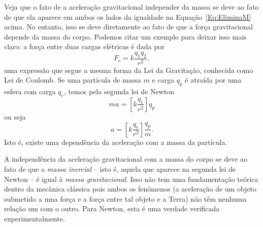 Veja que o fato de a aceleração gravitacional independer da massa se deve ao fato de que ela aparece em ambos os lados da igualdade na Equação~\eqref{Eq:EliminaM} acima. No entanto, isso se deve diretamente ao fato de que a força gravitacional depende da massa do corpo. Podemos citar um exemplo para deixar isso mais claro: a força entre duas cargas elétricas é dada por
\begin{equation}
  F_c = k \frac{q_1q_2}{r^2},
\end{equation}
%
uma expressão que segue a mesma forma da Lei da Gravitação, conhecida como Lei de Coulomb. Se uma partícula de massa $m$ e carga $q_p$ é atraída por uma esfera com carga $q_e$, temos pela segunda lei de Newton
\begin{equation}
  ma = \left[k \frac{q_e}{r^2}\right] q_p
\end{equation}
%
ou seja
\begin{equation}
  a = \left[k \frac{q_e}{r^2}\right] \frac{q_p}{m}.
\end{equation}
%
Isto é, existe uma dependência da aceleração com a massa da partícula.

A independência da aceleração gravitacional com a massa do corpo se deve ao fato de que a \emph{massa inercial} -- isto é, aquela que aparece na segunda lei de Newton -- é igual à \emph{massa gravitacional}. Isso não tem uma fundamentação teórica dentro da mecânica clássica pois ambos os fenômenos (a aceleração de um objeto submetido a uma força e a força entre tal objeto e a Terra) não têm nenhuma relação um com o outro. Para Newton, esta é uma verdade verificada experimentalmente.


